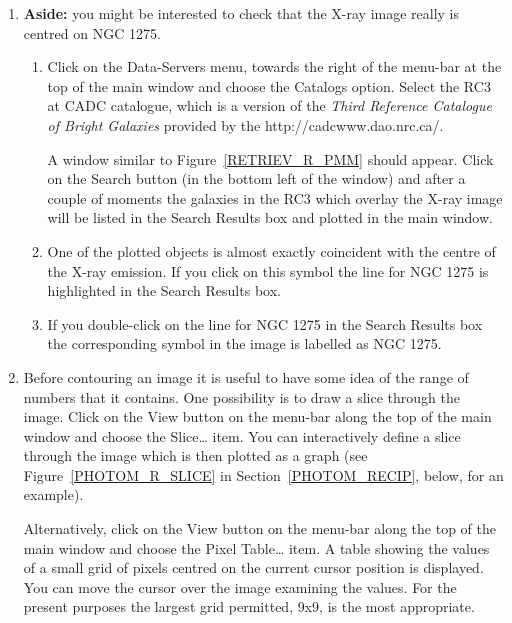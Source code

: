\documentclass[twoside,11pt]{starlink}
\begin{document}
\begin{enumerate}
  \item \textbf{Aside:} you might be interested to check that the X-ray
   image really is centred on NGC 1275.

  \begin{enumerate}

    \item Click on the \textsf{Data-Servers} menu, towards the right of the
     menu-bar at the top of the main window and choose the \textsf{Catalogs}
     option.  Select the \textsf{RC3 at CADC} catalogue, which is a version
     of the \textit{Third Reference Catalogue of Bright Galaxies}\/\cite{RC3}
     provided by the
     {http://cadcwww.dao.nrc.ca/}.

     A window similar to Figure~\ref{RETRIEV_R_PMM} should appear.  Click
     on the \textsf{Search} button (in the bottom left of the window) and
     after a couple of moments the galaxies in the RC3 which overlay the
     X-ray image will be listed in the \textsf{Search Results} box and plotted
     in the main window.

    \item One of the plotted objects is almost exactly coincident with the
     centre of the X-ray emission.  If you click on this symbol the line
     for NGC 1275 is highlighted in the \textsf{Search Results} box.

    \item If you double-click on the line for NGC 1275 in the \textsf{Search
     Results} box the corresponding symbol in the image is labelled as
     NGC 1275.

  \end{enumerate}

  \item Before contouring an image it is useful to have some idea of the
   range of numbers that it contains.  One possibility is to draw a slice
   through the image.  Click on the \textsf{View} button on the menu-bar
   along the top of the main window and choose the \textsf{Slice\ldots} item.
   You can interactively define a slice through the image which is then
   plotted as a graph (see Figure~\ref{PHOTOM_R_SLICE} in
   Section~\ref{PHOTOM_RECIP}, below, for an example).

   Alternatively, click on the \textsf{View} button on the menu-bar
   along the top of the main window and choose the \textsf{Pixel Table\ldots}
   item.  A table showing the values of a small grid of pixels centred on
   the current  cursor position is displayed.  You can move the cursor over
   the image examining the values.  For the present purposes the largest
   grid permitted, \textsf{9x9}, is the most appropriate.


\end{enumerate}
\end{document}
